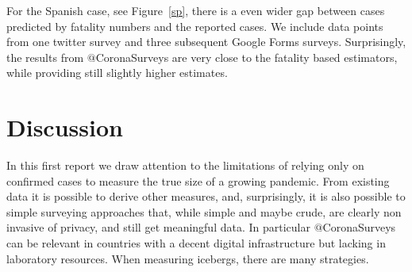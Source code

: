 \documentclass{article}
\begin{document}
For the Spanish case, see Figure~\ref{sp}, there is a even wider gap between cases predicted by fatality numbers and the reported cases. We include data points from one twitter survey and three subsequent Google Forms surveys. Surprisingly, the results from $@$CoronaSurveys are very close to the fatality based estimators, while providing still slightly higher estimates. 

\section{Discussion}

In this first report we draw attention to the limitations of relying only on confirmed cases to measure the true size of a growing pandemic. From existing data it is possible to derive other measures, and, surprisingly, it is also possible to simple surveying approaches that, while simple and maybe crude, are clearly non invasive of privacy, and still get meaningful data. In particular  $@$CoronaSurveys can be relevant in countries with a decent digital infrastructure but lacking in laboratory resources. When measuring icebergs,  there are many strategies. 
\end{document}
